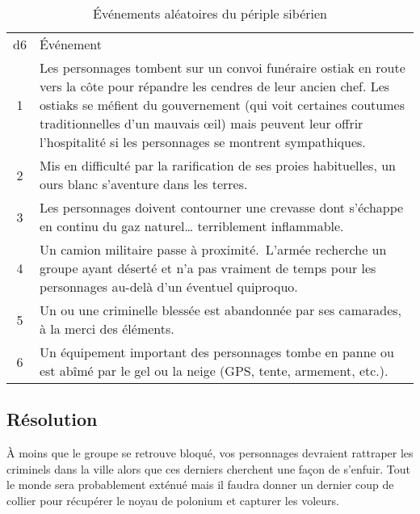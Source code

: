 \begin{table}
	\caption{Événements aléatoires du périple sibérien}
	\label{table:hiver}
	\begin{tabularx}{0.9\textwidth}{cX}
	d6 & Événement\\
	1  & Les personnages tombent sur un convoi funéraire ostiak en route vers la côte pour répandre les cendres de leur ancien chef. Les ostiaks se méfient du gouvernement (qui voit certaines coutumes traditionnelles d'un mauvais œil) mais peuvent leur offrir l'hospitalité si les personnages se montrent sympathiques.\\
	2  & Mis en difficulté par la rarification de ses proies habituelles, un ours blanc s'aventure dans les terres.\\
	3  & Les personnages doivent contourner une crevasse dont s'échappe en continu du gaz naturel… terriblement inflammable.\\
	4  & Un camion militaire passe à proximité. L'armée recherche un groupe ayant déserté et n'a pas vraiment de temps pour les personnages au-delà d'un éventuel quiproquo.\\
	5  & Un ou une criminelle blessée est abandonnée par ses camarades, à la merci des éléments.\\
	6  & Un équipement important des personnages tombe en panne ou est abîmé par le gel ou la neige (GPS, tente, armement, etc.).\\
	\end{tabularx}
\end{table}

\subsection{Résolution}

À moins que le groupe se retrouve bloqué, vos personnages devraient rattraper les criminels dans la ville alors que ces derniers cherchent une façon de s'enfuir.
Tout le monde sera probablement exténué mais il faudra donner un dernier coup de collier pour récupérer le noyau de polonium et capturer les voleurs.
